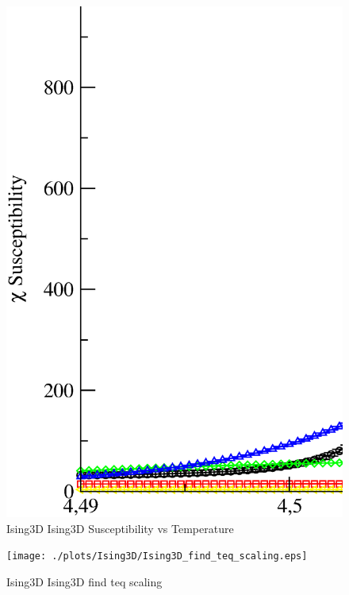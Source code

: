 \begin{figure}[!htpb]
  \centering
  \includegraphics[width=\textwidth]{./plots/Ising3D/Ising3D_Susceptibility_vs_Temperature.eps}
  \caption{Ising3D Ising3D Susceptibility vs Temperature}
\end{figure}

\begin{figure}[!htpb]
  \centering
  \texttt{[image: ./plots/Ising3D/Ising3D\_find\_teq\_scaling.eps]}
  \caption{Ising3D Ising3D find teq scaling}
\end{figure}


